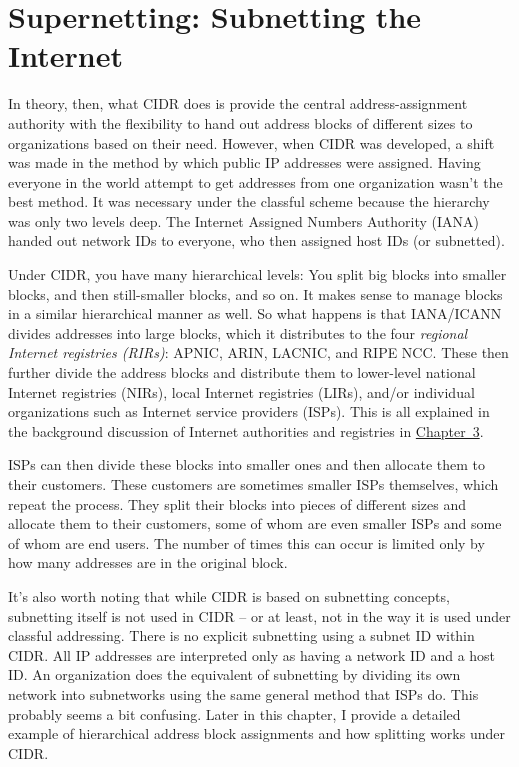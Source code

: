 \section{Supernetting: Subnetting the Internet}

In theory, then, what CIDR does is provide the central
address-assignment authority with the flexibility to hand out address
blocks of different sizes to organizations based on their need. However,
when CIDR was developed, a shift was made in the method by which public
IP addresses were assigned. Having everyone in the world attempt to get
addresses from one organization wasn't the best method. It was necessary
under the classful scheme because the hierarchy was only two levels
deep. The Internet Assigned Numbers Authority (IANA) handed out network
IDs to everyone, who then assigned host IDs (or subnetted).

Under CIDR, you have many hierarchical levels: You split big blocks into
smaller blocks, and then still-smaller blocks, and so on. It makes sense
to manage blocks in a similar hierarchical manner as well. So what
happens is that
IANA/ICANN
divides addresses into large blocks, which it distributes to the four
{\emph{regional
Internet registries (RIRs)}}: APNIC, ARIN, LACNIC, and RIPE NCC. These
then further divide the address blocks and distribute them to
lower-level national Internet registries (NIRs), local Internet
registries (LIRs), and/or individual organizations such as Internet
service providers (ISPs). This is all explained in the background
discussion of Internet authorities and registries in
\protect\hyperlink{ch03.html}{Chapter~3}.

ISPs can then divide these blocks into smaller ones and then allocate
them to their customers. These customers are sometimes smaller ISPs
themselves, which repeat the process. They split their blocks into
pieces of different sizes and allocate them to their customers, some of
whom are even smaller ISPs and some of whom are end users. The number of
times this can occur is limited only by how many addresses are in the
original block.

It's also worth noting that while CIDR is based on subnetting concepts,
subnetting itself is not used in CIDR -- or at least, not in the way it
is used under classful addressing. There is no explicit subnetting using
a subnet ID within CIDR. All IP addresses are interpreted only as having
a network ID and a host ID. An organization does the equivalent of
subnetting by dividing its own network into subnetworks using the same
general method that ISPs do. This probably seems a bit confusing. Later
in this chapter, I provide a detailed example of hierarchical address
block assignments and how splitting works under CIDR.

